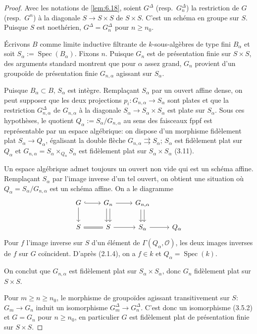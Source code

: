 \documentclass[12pt,a4paper]{article}
\theoremstyle{plain}
\theoremstyle{definition}
\theoremstyle{remark}
\DeclareMathOperator{\Spec}{Spec}
\begin{document}
\begin{proof}
Avec les notations de \ref{lem:6.18}, soient $G^\Delta$ (resp.~$G_n^\Delta$) la restriction de $G$ (resp.~$G^n$) à la diagonale $S \to S \times S$ de $S \times S$. C'est un schéma en groupe sur $S$. Puisque $S$ est noethérien, $G^\Delta = G_n^\Delta$ pour $n \geq n_0$.

Écrivons $B$ comme limite inductive filtrante de $k$-sous-algèbres de type fini $B_\alpha$ et soit $S_\alpha := \Spec(B_\alpha)$. Fixons $n$. Puisque $G_n$ est de présentation finie sur $S \times S$, des arguments standard montrent que pour $\alpha$ assez grand, $G_n$ provient d'un groupoïde de présentation finie $G_{n,\alpha}$ agissant sur $S_\alpha$.

Puisque $B_\alpha \subset B$, $S_\alpha$ est intègre. Remplaçant $S_\alpha$ par un ouvert affine dense, on peut supposer que les deux projections $p_i : G_{n,\alpha} \to S_\alpha$ sont plates et que la restriction $G_{n,\alpha}^\Delta$ de $G_{n,\alpha}$ à la diagonale $S_\alpha \to S_\alpha \times S_\alpha$ est plate sur $S_\alpha$. Sous ces hypothèses, le quotient $Q_\alpha := S_\alpha / G_{n,\alpha}$ au sens des faisceaux fppf est représentable par un espace algébrique: on dispose d'un morphisme fidèlement plat $S_\alpha \to Q_\alpha$, égalisant la double flèche $G_{n,\alpha} \rightrightarrows S_\alpha$; $S_\alpha$ est fidèlement plat sur $Q_\alpha$ et $G_{n,\alpha} = S_\alpha \times_{Q_\alpha} S_\alpha$ est fidèlement plat sur $S_\alpha \times S_\alpha$ (3.11).

Un espace algébrique admet toujours un ouvert non vide qui est un schéma affine. Remplaçant $S_\alpha$ par l'image inverse d'un tel ouvert, on obtient une situation où $Q_\alpha = S_\alpha / G_{n,\alpha}$ est un schéma affine. On a le diagramme
\[
\begin{tikzcd}
G \arrow[r, hook] \arrow[d] & G_n \arrow[r] \arrow[d, shift left] \arrow[d, shift right] & G_{n,\alpha} \arrow[d, shift left] \arrow[d, shift right] \\
S \arrow[r, equal] & S \arrow[r] & S_\alpha \arrow[r] & Q_\alpha
\end{tikzcd}
\]
Pour $f$ l'image inverse sur $S$ d'un élément de $\Gamma(Q_\alpha, \mathcal{O})$, les deux images inverses de $f$ sur $G$ coïncident. D'après (2.1.4), on a $f \in k$ et $Q_\alpha = \Spec(k)$.

On conclut que $G_{n,\alpha}$ est fidèlement plat sur $S_\alpha \times S_\alpha$, donc $G_n$ fidèlement plat sur $S \times S$.

Pour $m \geq n \geq n_0$, le morphisme de groupoïdes agissant transitivement sur $S$: $G_m \to G_n$ induit un isomorphisme $G_m^\Delta \to G_n^\Delta$. C'est donc un isomorphisme (3.5.2) et $G = G_n$ pour $n \geq n_0$, en particulier $G$ est fidèlement plat de présentation finie sur $S \times S$.
\end{proof}
\end{document}
